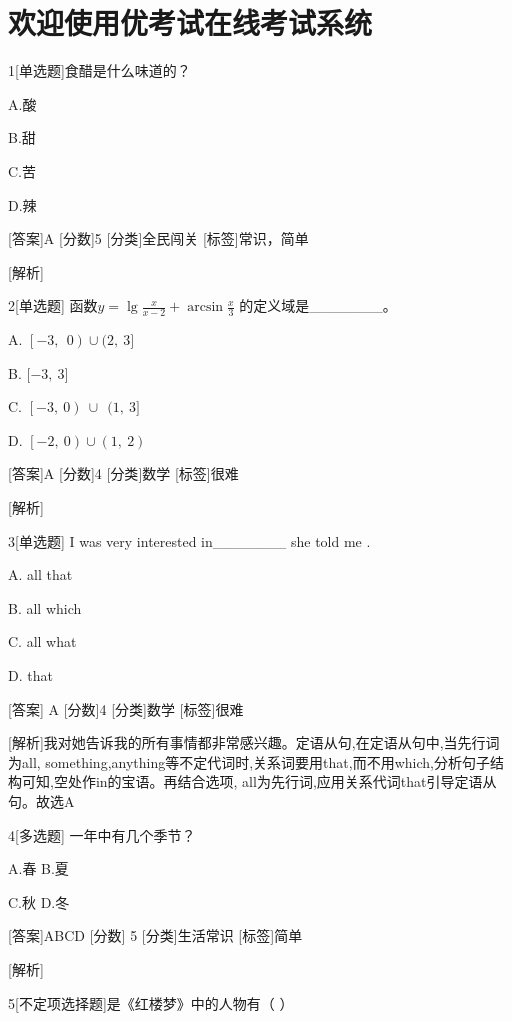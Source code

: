 \hypertarget{ux6b22ux8fceux4f7fux7528ux4f18ux8003ux8bd5ux5728ux7ebfux8003ux8bd5ux7cfbux7edf}{%
\section{欢迎使用优考试在线考试系统}\label{ux6b22ux8fceux4f7fux7528ux4f18ux8003ux8bd5ux5728ux7ebfux8003ux8bd5ux7cfbux7edf}}

1{[}单选题{]}食醋是什么味道的？

A.酸

B.甜

C.苦

D.辣

{[}答案{]}A {[}分数{]}5 {[}分类{]}全民闯关 {[}标签{]}常识，简单

{[}解析{]}

2{[}单选题{]}
函数\(y = \mathrm{\lg}\frac{x}{x - 2} + \mathrm{\arcsin}\frac{x}{3}\)
的定义域是\_\_\_\_\_\_\_。

A. \(\left\lbrack - 3,\ \ 0 \right) \cup (2,\ 3\rbrack\)

B. \(\lbrack - 3,\ 3\rbrack\)

C. \(\left\lbrack - 3,\ 0 \right)\  \cup \ \ (1,\ 3\rbrack\)

D. \(\left\lbrack - 2,\ 0 \right) \cup (1,\ 2)\)

{[}答案{]}A {[}分数{]}4 {[}分类{]}数学 {[}标签{]}很难

{[}解析{]}

3{[}单选题{]} I was very interested in\_\_\_\_\_\_\_ she told me .

A. all that

B. all which

C. all what

D. that

{[}答案{]} A {[}分数{]}4 {[}分类{]}数学 {[}标签{]}很难

{[}解析{]}我对她告诉我的所有事情都非常感兴趣。定语从句,在定语从句中,当先行词为all,
something,anything等不定代词时,关系词要用that,而不用which,分析句子结构可知,空处作in的宝语。再结合选项,
all为先行词,应用关系代词that引导定语从句。故选A

4{[}多选题{]} 一年中有几个季节？

A.春 B.夏

C.秋 D.冬

{[}答案{]}ABCD {[}分数{]} 5 {[}分类{]}生活常识 {[}标签{]}简单

{[}解析{]}

5{[}不定项选择题{]}是《红楼梦》中的人物有（ ）


